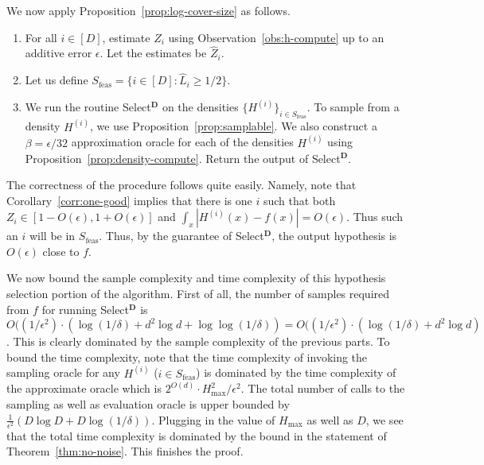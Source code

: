 We now apply Proposition~\ref{prop:log-cover-size} as follows. 
\begin{enumerate}
\item For all $i \in [D]$, estimate $Z_i$ using Observation~\ref{obs:h-compute} up to an additive error $\epsilon$. Let the estimates be $\hat{Z}_i$. 
\item Let us define $S_{\mathrm{feas}} = \{i \in [D]: \hat{L}_i \ge 1/2\}$. 
\item We run the routine \textsf{Select}$^{\mathbf{D}}$ on the densities $\{{H}^{(i)}\}_{i \in S_{\mathrm{feas}}}$. 
 To sample from a density ${H}^{(i)}$, we use Proposition~\ref{prop:samplable}. We also construct a $\beta = \epsilon/32$ approximation oracle
for each of the densities ${H}^{(i)}$ using Proposition~\ref{prop:density-compute}. Return the output of  \textsf{Select}$^{\mathbf{D}}$. 
\end{enumerate}
The correctness of the procedure follows quite easily. 
Namely, note that Corollary~\ref{corr:one-good} implies that there is one $i$ such that both $Z_i \in [1-O(\epsilon), 1+O(\epsilon)]$ and $\int_x |{H}^{(i)}(x) - f(x)| = O(\epsilon)$. Thus such an $i$ will be in $S_{\mathrm{feas}}$. Thus, by the guarantee of \textsf{Select}$^{\mathbf{D}}$, the output hypothesis is $O(\epsilon)$ close to $f$. 

We now bound the sample complexity and time complexity of this hypothesis selection portion of the algorithm. First of all, the number of samples required from $f$ for running  \textsf{Select}$^{\mathbf{D}}$ is  $O((1/\epsilon^2) \cdot (\log (1/\delta)  +d^2 \log d + \log \log (1/\delta)) = O((1/\epsilon^2) \cdot (\log (1/\delta)  +d^2 \log d )$. This is clearly dominated by the sample complexity of the previous parts. To bound the time complexity, note that the time complexity of invoking the sampling oracle for any ${H}^{(i)}$  ($ i \in S_{\mathrm{feas}}$) is dominated by the time complexity of the approximate oracle which is $2^{O(d)} \cdot H_{\max}^2/\epsilon^2$.  
The total number of calls to the sampling as well as evaluation oracle is upper bounded by $\frac{1}{\epsilon^2} (D \log D + D \log (1/\delta))$. Plugging in the value of $H_{\max}$ as well as $D$, we see that the total time complexity is dominated by the bound in the statement of Theorem~\ref{thm:no-noise}. This finishes the proof. 














